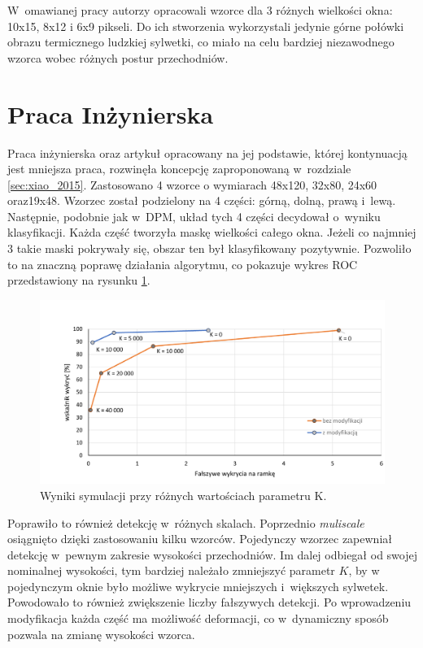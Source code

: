 W~omawianej pracy autorzy opracowali wzorce dla 3 różnych wielkości okna: 10x15, 8x12 i 6x9 pikseli. 
Do ich stworzenia wykorzystali jedynie górne połówki obrazu termicznego ludzkiej sylwetki, co miało na celu bardziej niezawodnego wzorca wobec różnych postur przechodniów.

\section{Praca Inżynierska}

Praca inżynierska \cite{kankaing} oraz artykuł opracowany na jej podstawie\cite{kanka2016fpga}, której kontynuacją jest mniejsza praca, rozwinęła koncepcję zaproponowaną w~rozdziale \ref{sec:xiao_2015}. 
Zastosowano 4 wzorce o wymiarach 48x120, 32x80, 24x60 oraz19x48. 
Wzorzec został podzielony na 4 części: górną, dolną, prawą i~lewą. 
Następnie, podobnie jak w~DPM, układ tych 4 części decydował o~wyniku klasyfikacji. 
Każda część tworzyła maskę wielkości całego okna. 
Jeżeli co najmniej 3 takie maski pokrywały się, obszar ten był klasyfikowany pozytywnie. 
Pozwoliło to na znaczną poprawę działania algorytmu, co pokazuje wykres ROC przedstawiony na rysunku \ref{fig:analiza_wykres}.
\begin{figure}
\centering
\includegraphics[width=0.8\linewidth]{images/Analiza_wykres}
\caption[Wykres REC]{Wyniki symulacji przy różnych wartościach parametru K.\cite{kankaing}}
\label{fig:analiza_wykres}
\end{figure}

Poprawiło to również detekcję w~różnych skalach. 
Poprzednio \textit{muliscale} osiągnięto dzięki zastosowaniu kilku wzorców. %
Pojedynczy wzorzec zapewniał detekcję w~pewnym zakresie wysokości przechodniów. 
Im dalej odbiegał od swojej nominalnej wysokości, tym bardziej należało zmniejszyć parametr $K$, by w pojedynczym oknie było możliwe wykrycie mniejszych i~większych sylwetek. %
Powodowało to również zwiększenie liczby fałszywych detekcji. 
Po wprowadzeniu modyfikacja każda część ma możliwość deformacji, co w~dynamiczny sposób pozwala na zmianę wysokości wzorca.

